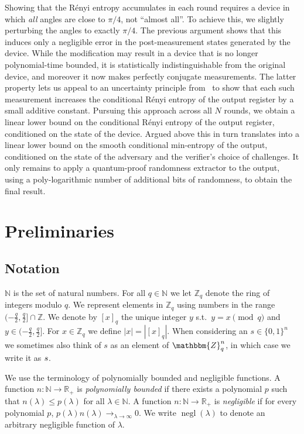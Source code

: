 \documentclass[11pt]{article}
\theoremstyle{remark}
\theoremstyle{definition}
\newcommand{\N}{\ensuremath{\mathbb{N}}}
\newcommand{\bbN}{\ensuremath{\mathbb{N}}}
\newcommand{\R}{\ensuremath{\mathbb{R}}}
\DeclareMathOperator{\negl}{negl}
\newcommand{\mZ}{\mathbbm{Z}}
\newcommand{\trnq}[1]{\left[ {#1} \right]_q}
\newcommand{\bbZ}{\mathbb{Z}}
\newcommand{\abs}[1]{\left\vert {#1} \right\vert}
\begin{document}
Showing that the R\'enyi entropy accumulates in each round requires a device in which \emph{all} angles are close to $\pi/4$, not ``almost all''. To achieve this, we slightly perturbing the angles to 
exactly $\pi/4$. The previous argument shows that this induces only a negligible error in the post-measurement states generated by the device. While the modification may result in a device that is no longer polynomial-time bounded, it is statistically indistinguishable from the original device, and moreover it now makes perfectly conjugate measurements. The latter property lets us appeal to
an uncertainty principle from~\cite{miller2014universal} to show that each such measurement increases the conditional R\'enyi entropy of the output register by a small additive constant. Pursuing this approach across all $N$ rounds, we obtain a linear lower bound on the conditional R\'enyi entropy of the output register, conditioned on the  state of the device. Argued above this in turn translates into a linear lower bound on the smooth conditional min-entropy of the output, conditioned on the state of the adversary and the verifier's choice of challenges. It only remains to apply a quantum-proof randomness extractor to the output, using a poly-logarithmic number of additional bits of randomness, to obtain the final result. 


\section{Preliminaries}
\label{sec:prelim}

\subsection{Notation}

$\N$ is the set of natural numbers. 
For all $q \in \bbN$ we let $\bbZ_q$ denote the ring of integers modulo $q$. We represent elements in $\bbZ_q$ using numbers in the range $(-\tfrac{q}{2}, \tfrac{q}{2}] \cap \bbZ$. We denote by $\trnq{x}$ the unique integer $y$ s.t.\ $y = x \pmod{q}$ and $y \in (-\frac{q}{2}, \frac{q}{2}]$. For $x\in\bbZ_q$ we define $\abs{x}=|{\trnq{x}}|$.
When considering an $s\in \{0,1\}^n$ we sometimes also think of $s$ as an element of $\mZ_q^n$, in which case we write it as $\*s$. 

We use the terminology of polynomially bounded and negligible functions. A function $n: \N \to \R_+$ is \emph{polynomially bounded} if there exists a polynomial $p$ such that $n(\lambda)\leq p(\lambda)$ for all $\lambda \in \N$. A function $n: \N \to \R_+$ is \emph{negligible} if for every polynomial $p$, $p(\lambda) n(\lambda)\to_{\lambda\to\infty} 0$. We write $\negl(\lambda)$ to denote an arbitrary negligible function of $\lambda$. 
\end{document}
